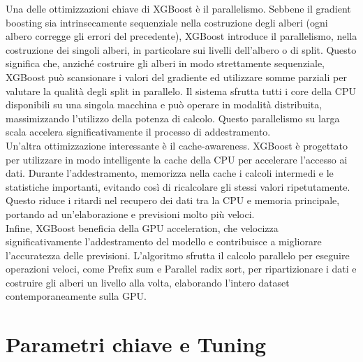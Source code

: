 \documentclass[a4paper,12pt]{report}
\begin{document}
	Una delle ottimizzazioni chiave di XGBoost è il parallelismo. Sebbene il gradient boosting sia intrinsecamente sequenziale nella costruzione degli alberi (ogni albero corregge gli errori del precedente), XGBoost introduce il parallelismo, nella costruzione dei singoli alberi, in particolare sui livelli dell'albero o di split. Questo significa che, anziché costruire gli alberi in modo strettamente sequenziale, XGBoost può scansionare i valori del gradiente ed utilizzare somme parziali per valutare la qualità degli split in parallelo. Il sistema sfrutta tutti i core della CPU disponibili su una singola macchina e può operare in modalità distribuita, massimizzando l'utilizzo della potenza di calcolo. Questo parallelismo su larga scala accelera significativamente il processo di addestramento. \\
	Un'altra ottimizzazione interessante è il cache-awareness. XGBoost è progettato per utilizzare in modo intelligente la cache della CPU per accelerare l'accesso ai dati. Durante l'addestramento, memorizza nella cache i calcoli intermedi e le statistiche importanti, evitando così di ricalcolare gli stessi valori ripetutamente. Questo riduce i ritardi nel recupero dei dati tra la CPU e memoria principale, portando ad un'elaborazione e previsioni molto più veloci. \\
	Infine, XGBoost beneficia della GPU acceleration, che velocizza significativamente l'addestramento del modello e contribuisce a migliorare l'accuratezza delle previsioni. L'algoritmo sfrutta il calcolo parallelo per eseguire operazioni veloci, come Prefix sum e Parallel radix sort, per ripartizionare i dati e costruire gli alberi un livello alla volta, elaborando l'intero dataset contemporaneamente sulla GPU. \\
	
	\section{Parametri chiave e Tuning}
	
\end{document}

